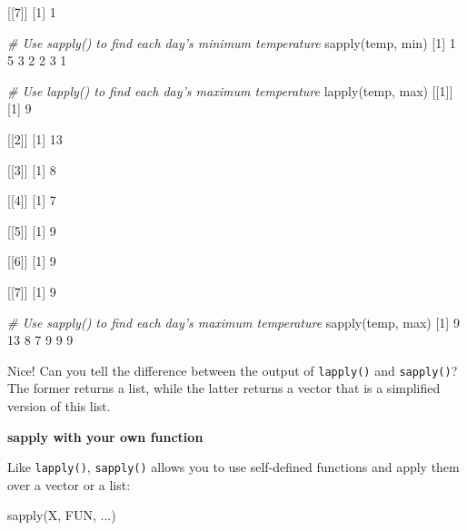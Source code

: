 \documentclass[]{article}
\newcommand{\hlnum}[1]{\textcolor[rgb]{0.816,0.125,0.439}{#1}}%
\newcommand{\hlcom}[1]{\textcolor[rgb]{0.502,0.502,0.502}{\textit{#1}}}%
\newcommand{\hlstd}[1]{\textcolor[rgb]{0.251,0.251,0.251}{#1}}%
\newcommand{\hlkwd}[1]{\textcolor[rgb]{0.878,0.439,0.125}{#1}}%
\newenvironment{Shaded}{\begin{myshaded}}{\end{myshaded}}
\newcommand{\KeywordTok}[1]{\hlkwd{#1}}
\newcommand{\DecValTok}[1]{\hlnum{#1}}
\newcommand{\CommentTok}[1]{\hlcom{#1}}
\newcommand{\NormalTok}[1]{\hlstd{#1}}
\begin{document}
\begin{Shaded}
\begin{Highlighting}[]
\NormalTok{   [[}\DecValTok{7}\NormalTok{]]}
\NormalTok{   [}\DecValTok{1}\NormalTok{] }\DecValTok{1}

\CommentTok{# Use sapply() to find each day's minimum temperature}
\KeywordTok{sapply}\NormalTok{(temp, min)}
\NormalTok{   [}\DecValTok{1}\NormalTok{] }\OperatorTok{-}\DecValTok{1}  \DecValTok{5} \OperatorTok{-}\DecValTok{3} \OperatorTok{-}\DecValTok{2}  \DecValTok{2} \OperatorTok{-}\DecValTok{3}  \DecValTok{1}

\CommentTok{# Use lapply() to find each day's maximum temperature}
\KeywordTok{lapply}\NormalTok{(temp, max)}
\NormalTok{   [[}\DecValTok{1}\NormalTok{]]}
\NormalTok{   [}\DecValTok{1}\NormalTok{] }\DecValTok{9}
   
\NormalTok{   [[}\DecValTok{2}\NormalTok{]]}
\NormalTok{   [}\DecValTok{1}\NormalTok{] }\DecValTok{13}
   
\NormalTok{   [[}\DecValTok{3}\NormalTok{]]}
\NormalTok{   [}\DecValTok{1}\NormalTok{] }\DecValTok{8}
   
\NormalTok{   [[}\DecValTok{4}\NormalTok{]]}
\NormalTok{   [}\DecValTok{1}\NormalTok{] }\DecValTok{7}
   
\NormalTok{   [[}\DecValTok{5}\NormalTok{]]}
\NormalTok{   [}\DecValTok{1}\NormalTok{] }\DecValTok{9}
   
\NormalTok{   [[}\DecValTok{6}\NormalTok{]]}
\NormalTok{   [}\DecValTok{1}\NormalTok{] }\DecValTok{9}
   
\NormalTok{   [[}\DecValTok{7}\NormalTok{]]}
\NormalTok{   [}\DecValTok{1}\NormalTok{] }\DecValTok{9}

\CommentTok{# Use sapply() to find each day's maximum temperature}
\KeywordTok{sapply}\NormalTok{(temp, max)}
\NormalTok{   [}\DecValTok{1}\NormalTok{]  }\DecValTok{9} \DecValTok{13}  \DecValTok{8}  \DecValTok{7}  \DecValTok{9}  \DecValTok{9}  \DecValTok{9}
\end{Highlighting}
\end{Shaded}

Nice! Can you tell the difference between the output of
\texttt{lapply()} and \texttt{sapply()}? The former returns a list,
while the latter returns a vector that is a simplified version of this
list.

\textbf{sapply with your own function}

Like \texttt{lapply()}, \texttt{sapply()} allows you to use self-defined
functions and apply them over a vector or a list:

\begin{Shaded}
\begin{Highlighting}[]
\KeywordTok{sapply}\NormalTok{(X, FUN, ...)}
\end{Highlighting}
\end{Shaded}
\end{document}
